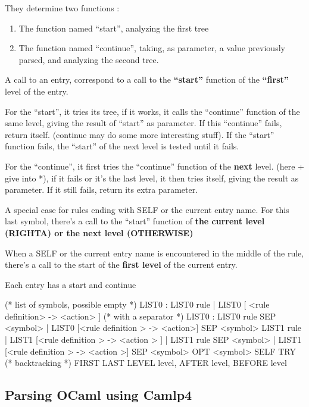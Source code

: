 \begin{enumerate}
  They determine two functions :
  \begin{enumerate}
  \item The function named {\color{red} ``start''}, analyzing the first tree
  \item The function named {\color{red} ``continue''}, taking, as parameter, a value
    previously parsed, and analyzing the second tree. 
  \end{enumerate}

  A call to an entry, correspond to a call to the \textbf{``start''} function of
  the \textbf{``first''} level of the entry.

  For the ``start'', it tries its tree, if it works, it calls the
  ``continue'' function of the same level, giving the result of ``start''
  as parameter. If this ``continue'' fails, return itself. (continue may
  do some more interesting stuff). If the ``start'' function fails, the
  ``start'' of the next level is tested until it fails. 


  For the ``continue'', it first tries the ``continue'' function of the
  \textbf{next} level. (here + give into *), if it fails or it's the
  last level, it then tries itself, giving the result as parameter. If
  it still fails, return its extra parameter.

  A special case for rules ending with SELF or the current entry
  name. For this last symbol, there's a call to the ``start'' function
  of \textbf{the current level (RIGHTA) or the next level (OTHERWISE)}

  When a SELF or the current entry name is encountered in the middle
  of the rule, there's a call to the start of the \textbf{first level} of the
  current entry.

  Each entry has a start and continue

\begin{ocamlcode}
(* list of symbols, possible empty *)
LIST0 : LIST0 rule | LIST0 [ <rule definition> -> <action> ]
(* with a separator *)
LIST0 : LIST0 rule SEP <symbol>
| LIST0 [<rule definition > -> <action>] SEP <symbol>
  LIST1 rule
| LIST1 [<rule definition > -> <action > ]
| LIST1 rule SEP <symbol>
| LIST1 [<rule definition > -> <action >] SEP <symbol>
OPT <symbol>
SELF
TRY (* backtracking *)
FIRST LAST LEVEL level, AFTER level, BEFORE level 
\end{ocamlcode}

\end{enumerate}

\subsection{Parsing OCaml using Camlp4}

